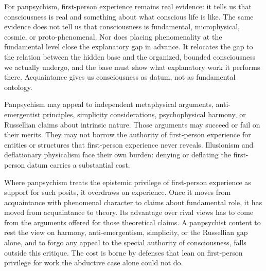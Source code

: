 For panpsychism, first-person experience remains real evidence: it tells us that consciousness is real and something about what conscious life is like. The same evidence does not tell us that consciousness is fundamental, microphysical, cosmic, or proto-phenomenal. Nor does placing phenomenality at the fundamental level close the explanatory gap in advance. It relocates the gap to the relation between the hidden base and the organized, bounded consciousness we actually undergo, and the base must show what explanatory work it performs there. Acquaintance gives us consciousness as datum, not as fundamental ontology.

Panpsychism may appeal to independent metaphysical arguments, anti-emergentist principles, simplicity considerations, psychophysical harmony, or Russellian claims about intrinsic nature. Those arguments may succeed or fail on their merits. They may not borrow the authority of first-person experience for entities or structures that first-person experience never reveals. Illusionism and deflationary physicalism face their own burden: denying or deflating the first-person datum carries a substantial cost.

Where panpsychism treats the epistemic privilege of first-person experience as support for such posits, it overdraws on experience. Once it moves from acquaintance with phenomenal character to claims about fundamental role, it has moved from acquaintance to theory. Its advantage over rival views has to come from the arguments offered for those theoretical claims. A panpsychist content to rest the view on harmony, anti-emergentism, simplicity, or the Russellian gap alone, and to forgo any appeal to the special authority of consciousness, falls outside this critique. The cost is borne by defenses that lean on first-person privilege for work the abductive case alone could not do.
